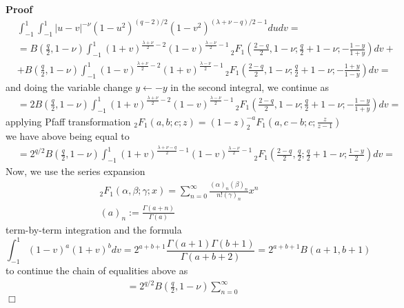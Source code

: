\documentclass{article}
\newcommand{\assign}{:=}
\renewenvironment{proof}{\noindent\textbf{Proof\ }}{\hspace*{\fill}$\Box$\medskip}
\theoremstyle{remark}
\begin{document}
\begin{proof}
\begin{eqnarray}
    & \int_{- 1}^1 \int_{- 1}^1 | u - v |^{- \nu} (1 - u^2)^{(q - 2) / 2} (1
    - v^2)^{(\lambda + \nu - q) / 2 - 1} d u d v = &  \nonumber\\
    & = B \left( \frac{q}{2}, 1 - \nu \right) \int_{- 1}^1 (1 +
    v)^{\frac{\lambda + \nu}{2} - 2} (1 - v)^{\frac{\lambda - \nu}{2} - 1}
    \,^{}_2 F_1 \left( \frac{2 - q}{2}, 1 - \nu ; \frac{q}{2} + 1 - \nu ; -
    \frac{1 - y}{1 + y} \right) d v + &  \nonumber\\
    & + B \left( \frac{q}{2}, 1 - \nu \right) \int_{- 1}^1 (1 -
    v)^{\frac{\lambda + \nu}{2} - 2} (1 + v)^{\frac{\lambda - \nu}{2} - 1}
    \,^{}_2 F_1 \left( \frac{2 - q}{2}, 1 - \nu ; \frac{q}{2} + 1 - \nu ; -
    \frac{1 + y}{1 - y} \right) d v = &  \nonumber
  \end{eqnarray}
  and doing the variable change $y \leftarrow - y$ in the second integral, we
  continue as
  \begin{eqnarray}
    & = 2 B \left( \frac{q}{2}, 1 - \nu \right) \int_{- 1}^1 (1 +
    v)^{\frac{\lambda + \nu}{2} - 2} (1 - v)^{\frac{\lambda - \nu}{2} - 1}
    \,^{}_2 F_1 \left( \frac{2 - q}{2}, 1 - \nu ; \frac{q}{2} + 1 - \nu ; -
    \frac{1 - y}{1 + y} \right) d v = &  \nonumber
  \end{eqnarray}
  applying Pfaff transformation $_2 F_1 (a, b ; c ; z) = (1 - z)^{- a} _2
  F_1 \left( a, c - b ; c ; \frac{z}{z - 1} \right)$ we have above being equal
  to
  \begin{eqnarray}
    & = 2^{q / 2} B \left( \frac{q}{2}, 1 - \nu \right) \int_{- 1}^1 (1 +
    v)^{\frac{\lambda + \nu - q}{2} - 1} (1 - v)^{\frac{\lambda - \nu}{2} - 1}
    \,^{}_2 F_1 \left( \frac{2 - q}{2}, \frac{q}{2} ; \frac{q}{2} + 1 - \nu ;
    \frac{1 - y}{2} \right) d v = &  \nonumber
  \end{eqnarray}
  Now, we use the series expansion
  \begin{eqnarray}
    & _2 F_1 (\alpha, \beta ; \gamma ; x) = \sum_{n = 0}^{\infty}
    \frac{(\alpha)_n (\beta)_n}{n! (\gamma)_n} x^n &  \nonumber\\
    & (a)_n \assign \frac{\Gamma (a + n)}{\Gamma (a)} &  \nonumber
  \end{eqnarray}
  term-by-term integration and the formula
  \[ \int_{- 1}^1 (1 - v)^a (1 + v)^b d v = 2^{a + b + 1} \frac{\Gamma (a + 1)
     \Gamma (b + 1)}{\Gamma (a + b + 2)} = 2^{a + b + 1} B (a + 1, b + 1) \]
  to continue the chain of equalities above as
  \begin{eqnarray}
    & = 2^{q / 2} B \left( \frac{q}{2}, 1 - \nu \right) \sum_{n = 0}^{\infty}

\end{eqnarray}
\end{proof}
\end{document}
